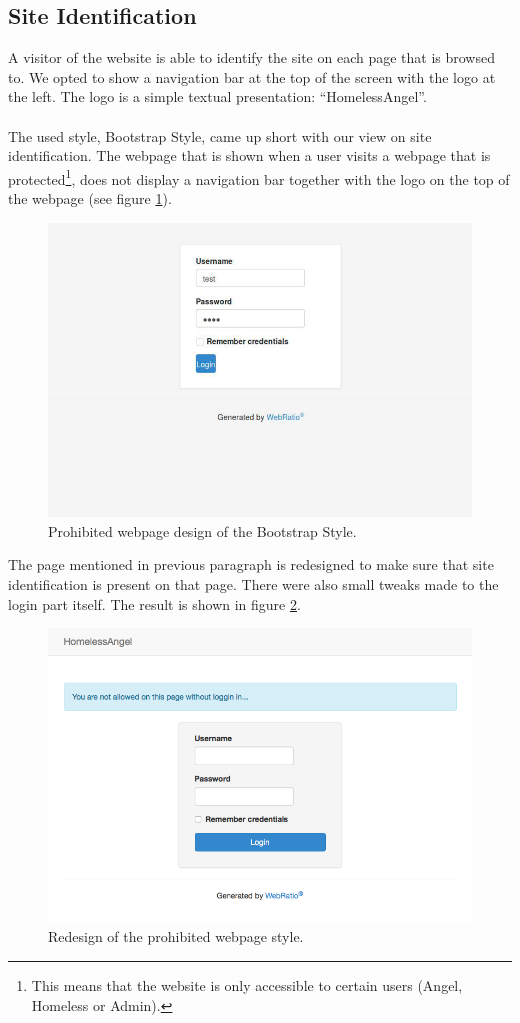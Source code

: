 \documentclass[a4paper]{report}
\begin{document}
\subsection{Site Identification}
A visitor of the website is able to identify the site on each page that is browsed to. We opted to show a navigation bar at the top of the screen with the logo at the left. The logo is a simple textual presentation: ``HomelessAngel''. 
\\\\
The used style, Bootstrap Style, came up short with our view on site identification. The webpage that is shown when a user visits a webpage that is protected\footnote{This means that the website is only accessible to certain users (Angel, Homeless or Admin).}, does not display a navigation bar together with the logo on the top of the webpage (see figure \ref{fig:designProtectedOld}).
\begin{figure}[h]
    \centering
    \includegraphics[width=.7\textwidth]{screenshots/designProtectedOld}
    \caption{Prohibited webpage design of the Bootstrap Style.}
    \label{fig:designProtectedOld}
\end{figure}
The page mentioned in previous paragraph is redesigned to make sure that site identification is present on that page. There were also small tweaks made to the login part itself. The result is shown in figure \ref{fig:designProtectedNew}.
\begin{figure}[h]
    \centering
    \includegraphics[width=.7\textwidth]{screenshots/designProtectedNew}
    \caption{Redesign of the prohibited webpage style.}
    \label{fig:designProtectedNew}
\end{figure}
\end{document}
